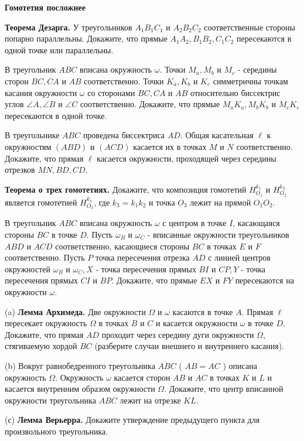 \centerline{\bf \Huge Гомотетия посложнее}

\textbf{Теорема Дезарга.} У треугольников $A_1 B_1 C_1$ и $A_2 B_2 C_2$ соответственные стороны попарно параллельны. Докажите, что прямые $A_1 A_2, B_1 B_2, C_1 C_2$ пересекаются в одной точке или параллельны.

В треугольник $A B C$ вписана окружность $\omega$. Точки $M_a, M_b$ и $M_c$ - середины сторон $B C, C A$ и $A B$ соответственно. Точки $K_a, K_b$ и $K_c$ симметричны точкам касания окружности $\omega$ со сторонами $B C, C A$ и $A B$ относительно биссектрис углов $\angle A, \angle B$ и $\angle C$ соответственно. Докажите, что прямые $M_a K_a, M_b K_b$ и $M_c K_c$ пересекаются в одной точке.

В треугольнике $A B C$ проведена биссектриса $A D$. Общая касательная $\ell$ к окружностям $(A B D)$ и $(A C D)$ касается их в точках $M$ и $N$ соответственно. Докажите, что прямая $\ell$ касается окружности, проходящей через середины отрезков $M N, B D, C D$.

\textbf{Теорема о трех гомотетиях.} Докажите, что композиция гомотетий $H_{O_1}^{k_1}$ и $H_{O_2}^{k_2}$ является гомотетией $H_{O_3}^{k_3}$, где $k_3=k_1 k_2$ и точка $O_3$ лежит на прямой $O_1 O_2$.


В треугольник $A B C$ вписана окружность $\omega$ с центром в точке $I$, касающаяся стороны $B C$ в точке $D$. Пусть $\omega_B$ и $\omega_C$ - вписанные окружности треугольников $A B D$ и $A C D$ соответственно, касающиеся стороны $B C$ в точках $E$ и $F$ соответственно. Пусть $P$ точка пересечения отрезка $A D$ с линией центров окружностей $\omega_B$ и $\omega_C, X$ - точка пересечения прямых $B I$ и $C P, Y$ - точка пересечения прямых $C I$ и $B P$. Докажите, что прямые $E X$ и $F Y$ пересекаются на окружности $\omega$.

(a) \textbf{Лемма Архимеда.} Две окружности $\Omega$ и $\omega$ касаются в точке $A$. Прямая $\ell$ пересекает окружность $\Omega$ в точках $B$ и $C$ и касается окружности $\omega$ в точке $D$. Докажите, что прямая $A D$ проходит через середину дуги окружности $\Omega$, стягиваемую хордой $B C$ (разберите случаи внешнего и внутреннего касания). 

(b) Вокруг равнобедренного треугольника $A B C$ ( $A B=A C$ ) описана окружность $\Omega$. Окружность $\omega$ касается сторон $A B$ и $A C$ в точках $K$ и $L$ и касается внутренним образом окружности $\Omega$. Докажите, что центр вписанной окружности треугольника $A B C$ лежит на отрезке $K L$. 

(с) \textbf{Лемма Верьерра.} Докажите утверждение предыдущего пункта для произвольного треугольника.